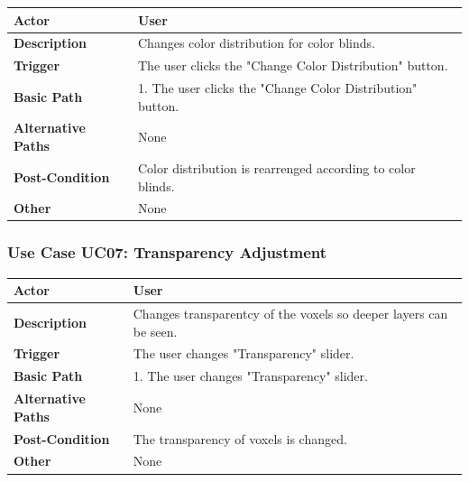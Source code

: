 \documentclass[paper=a4, fontsize=12pt]{scrartcl}	%
\numberwithin{equation}{section}		%
\numberwithin{figure}{section}			%
\numberwithin{table}{section}				%
\newcommand{\skipsubsection}[0]{\vspace{1cm}}
\begin{document}
    	\begin{center}
        	\begin{tabular}{ | p{4cm} | p{9cm} |}
            	\hline
                	\textbf{Actor} & User\\ \hline
                    \textbf{Description} & Changes color distribution for color blinds.\\ \hline
                    \textbf{Trigger} & The user clicks the "Change Color Distribution" button.\\ \hline
                    \textbf{Basic Path} & 1. The user clicks the "Change Color Distribution" button.\\ \hline
                    \textbf{Alternative Paths} & None\\ \hline
                    \textbf{Post-Condition} & Color distribution is rearrenged according to color blinds.\\ \hline
                    \textbf{Other} & None\\
                \hline
            \end{tabular}
        \end{center}
    \skipsubsection
    
    \subsubsection{Use Case UC07: Transparency Adjustment}
    \begin{center}
    \end{center}
    	\begin{center}
        	\begin{tabular}{ | p{4cm} | p{9cm} |}
            	\hline
                	\textbf{Actor} & User\\ \hline
                    \textbf{Description} & Changes transparentcy of the voxels so deeper layers can be seen.\\ \hline
                    \textbf{Trigger} & The user changes "Transparency" slider.\\ \hline
                    \textbf{Basic Path} & 1. The user changes "Transparency" slider.\\ \hline
                    \textbf{Alternative Paths} & None\\ \hline
                    \textbf{Post-Condition} & The transparency of voxels is changed.\\ \hline
                    \textbf{Other} & None\\
                \hline
            \end{tabular}
        \end{center}
    \skipsubsection
    
\end{document}
